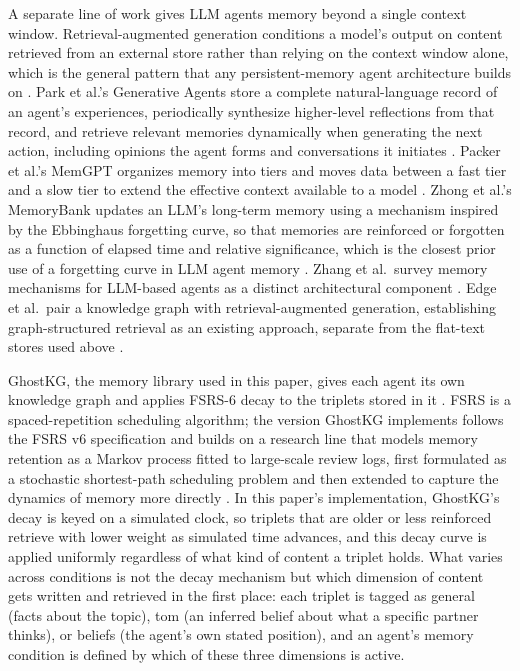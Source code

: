 \documentclass[11pt,a4paper]{article}
\begin{document}
A separate line of work gives LLM agents memory beyond a single context window. Retrieval-augmented generation conditions a model's output on content retrieved from an external store rather than relying on the context window alone, which is the general pattern that any persistent-memory agent architecture builds on \citep{lewis2020rag}. Park et al.'s Generative Agents store a complete natural-language record of an agent's experiences, periodically synthesize higher-level reflections from that record, and retrieve relevant memories dynamically when generating the next action, including opinions the agent forms and conversations it initiates \citep{park2023generative}. Packer et al.'s MemGPT organizes memory into tiers and moves data between a fast tier and a slow tier to extend the effective context available to a model \citep{packer2023memgpt}. Zhong et al.'s MemoryBank updates an LLM's long-term memory using a mechanism inspired by the Ebbinghaus forgetting curve, so that memories are reinforced or forgotten as a function of elapsed time and relative significance, which is the closest prior use of a forgetting curve in LLM agent memory \citep{zhong2024memorybank}. Zhang et al.\ survey memory mechanisms for LLM-based agents as a distinct architectural component \citep{zhang2025memorysurvey}. Edge et al.\ pair a knowledge graph with retrieval-augmented generation, establishing graph-structured retrieval as an existing approach, separate from the flat-text stores used above \citep{edge2024graphrag}.

GhostKG, the memory library used in this paper, gives each agent its own knowledge graph and applies FSRS-6 decay to the triplets stored in it \citep{ghostkg}. FSRS is a spaced-repetition scheduling algorithm; the version GhostKG implements follows the FSRS v6 specification \citep{fsrs_algorithm} and builds on a research line that models memory retention as a Markov process fitted to large-scale review logs, first formulated as a stochastic shortest-path scheduling problem \citep{ye2022ssp} and then extended to capture the dynamics of memory more directly \citep{su2023dynamics}. In this paper's implementation, GhostKG's decay is keyed on a simulated clock, so triplets that are older or less reinforced retrieve with lower weight as simulated time advances, and this decay curve is applied uniformly regardless of what kind of content a triplet holds. What varies across conditions is not the decay mechanism but which dimension of content gets written and retrieved in the first place: each triplet is tagged as general (facts about the topic), tom (an inferred belief about what a specific partner thinks), or beliefs (the agent's own stated position), and an agent's memory condition is defined by which of these three dimensions is active.
\end{document}

